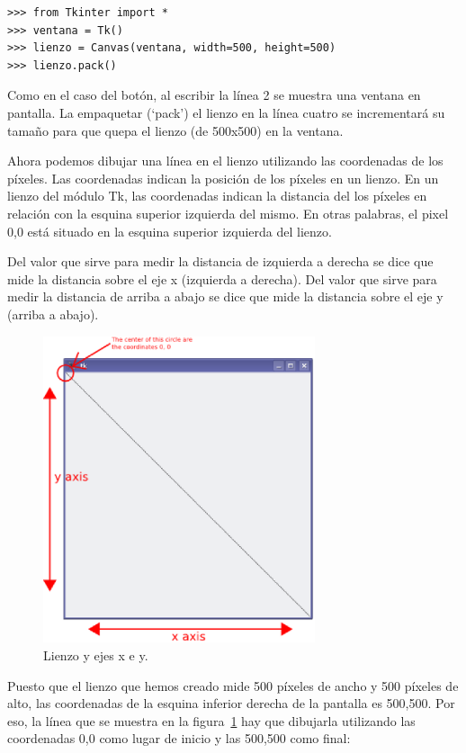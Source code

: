\begin{listing}
\begin{verbatim}
>>> from Tkinter import *
>>> ventana = Tk()
>>> lienzo = Canvas(ventana, width=500, height=500)
>>> lienzo.pack()
\end{verbatim}
\end{listing}

Como en el caso del botón, al escribir la línea 2 se muestra una ventana en pantalla. La empaquetar (`pack') el lienzo en la línea cuatro se incrementará su tamaño para que quepa el lienzo (de 500x500) en la ventana.

Ahora podemos dibujar una línea en el lienzo utilizando las coordenadas de los píxeles.  Las coordenadas indican la posición de los píxeles en un lienzo.  En un lienzo del módulo Tk, las coordenadas indican la distancia del los píxeles en relación con la esquina superior izquierda del mismo. En otras palabras, el pixel 0,0 está situado en la esquina superior izquierda del lienzo.  

Del valor que sirve para medir la distancia de izquierda a derecha se dice que mide la distancia sobre el eje x (izquierda a derecha).  Del valor que sirve para medir la distancia de arriba a abajo se dice que mide la distancia sobre el eje y (arriba a abajo).

\begin{figure}
\begin{center}
\includegraphics[width=80mm]{figure32.eps}
\end{center}
\caption{Lienzo y ejes x e y.}\label{fig32}
\end{figure}

Puesto que el lienzo que hemos creado mide 500 píxeles de ancho y 500 píxeles de alto, las coordenadas de la esquina inferior derecha de la pantalla es 500,500. Por eso, la línea que se muestra en la figura~\ref{fig32} hay que dibujarla utilizando las coordenadas 0,0 como lugar de inicio y las 500,500 como final:


